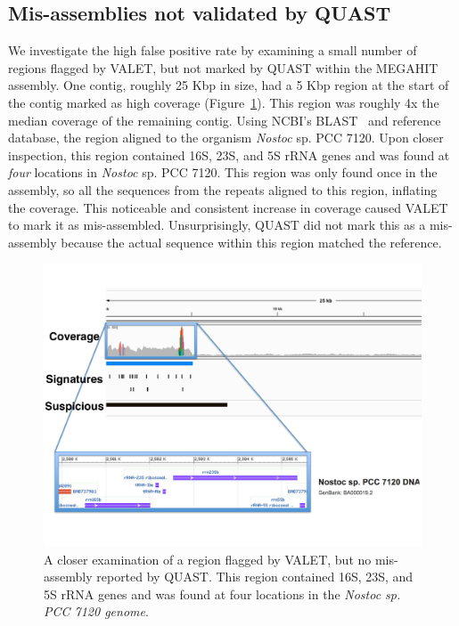 \documentclass{article}
\begin{document}
\subsection{Mis-assemblies not validated by QUAST}
We investigate the high false positive rate by examining a small number of regions flagged by VALET, but not marked by QUAST within the MEGAHIT assembly.
One contig, roughly 25 Kbp in size, had a 5 Kbp region at the start of the contig marked as high coverage (Figure~\ref{fig:rrna_coverages}).
This region was roughly 4x the median coverage of the remaining contig.
Using NCBI's BLAST~\citep{blast} and reference database, the region aligned to the organism \emph{Nostoc} sp. PCC 7120.
Upon closer inspection, this region contained 16S, 23S, and 5S rRNA genes and was found at \emph{four} locations in \emph{Nostoc} sp. PCC 7120.
This region was only found once in the assembly, so all the sequences from the repeats aligned to this region, inflating the coverage.
This noticeable and consistent increase in coverage caused VALET to mark it as mis-assembled.
Unsurprisingly, QUAST did not mark this as a mis-assembly because the actual sequence within this region matched the reference.

\begin{figure}[tb!]
\begin{center}
\includegraphics[width=\textwidth]{figures/rrna_coverages}
\end{center}
\caption[16S_rrna]{A closer examination of a region flagged by VALET, but no mis-assembly reported by QUAST. This region contained 16S, 23S, and 5S rRNA genes and was found at four locations in the \emph{Nostoc sp. PCC 7120 genome}.}
\label{fig:rrna_coverages}
\end{figure}
\end{document}
